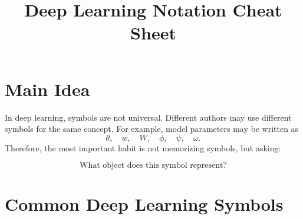 \documentclass{article}
\title{Deep Learning Notation Cheat Sheet}
\author{}
\date{}
\begin{document}
\maketitle

\section*{Main Idea}

In deep learning, symbols are not universal. Different authors may use different symbols for the same concept. For example, model parameters may be written as
\[
\theta,\quad w,\quad W,\quad \phi,\quad \psi,\quad \omega.
\]
Therefore, the most important habit is not memorizing symbols, but asking:

\[
\text{What object does this symbol represent?}
\]

\section*{Common Deep Learning Symbols}
\end{document}
